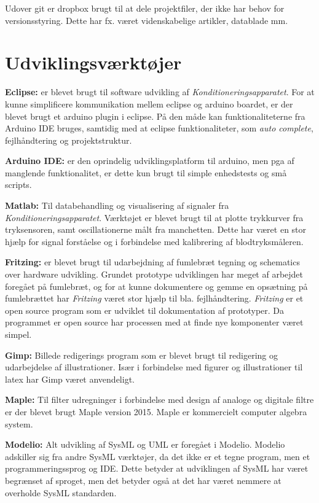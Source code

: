 Udover git er dropbox brugt til at dele projektfiler, der ikke har behov for versionsstyring. Dette har fx. været videnskabelige artikler, datablade mm. 

\section{Udviklingsværktøjer}\label{title:udviklingsvaerktoejer}
\textbf{Eclipse:} er blevet brugt til software udvikling af \textit{Konditioneringsapparatet}. For at kunne simplificere kommunikation mellem eclipse og arduino boardet, er der blevet brugt et arduino plugin i eclipse. På den måde kan funktionaliteterne fra Arduino IDE bruges, samtidig med at eclipse funktionaliteter, som \textit{auto complete}, fejlhåndtering og projektstruktur. 

\textbf{Arduino IDE:} er den oprindelig udviklingsplatform til arduino, men pga af manglende funktionalitet, er dette kun brugt til simple enhedstests og små scripts. 

\textbf{Matlab:} Til databehandling og visualisering af signaler fra \textit{Konditioneringsapparatet}. Værktøjet er blevet brugt til at plotte trykkurver fra tryksensoren, samt oscillationerne målt fra manchetten. Dette har været en stor hjælp for signal forståelse og i forbindelse med kalibrering af blodtryksmåleren. 

\textbf{Fritzing:} er blevet brugt til udarbejdning af fumlebræt tegning og schematics over hardware udvikling. Grundet prototype udviklingen har meget af arbejdet foregået på fumlebræt, og for at kunne dokumentere og \textquotedbl gemme\textquotedbl{} en opsætning på fumlebrættet har \textit{Fritzing} været stor hjælp til bla. fejlhåndtering. \textit{Fritzing} er et open source program som er udviklet til dokumentation af prototyper. Da programmet er open source har processen med at finde nye komponenter været simpel. 

\textbf{Gimp:} Billede redigerings program som er blevet brugt til redigering og udarbejdelse af illustrationer. Især i forbindelse med figurer og illustrationer til latex har Gimp været anvendeligt. 

\textbf{Maple:} Til filter udregninger i forbindelse med design af analoge og digitale filtre er der blevet brugt Maple version 2015. Maple er kommercielt computer algebra system. 

\textbf{Modelio:} Alt udvikling af SysML og UML er foregået i Modelio. Modelio adskiller sig fra andre SysML værktøjer, da det ikke er et tegne program, men et programmeringssprog og IDE. Dette betyder at udviklingen af SysML har været begrænset af sproget, men det betyder også at det har været nemmere at overholde SysML standarden. 

